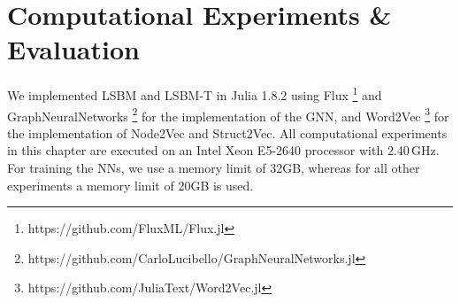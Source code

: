 \documentclass[draft,final]{vutinfth} %
\begin{document}



\chapter{Computational Experiments \& Evaluation}\label{chp:evaluation}

We implemented LSBM and LSBM-T in Julia 1.8.2 using Flux \footnote{https://github.com/FluxML/Flux.jl} and GraphNeuralNetworks \footnote{https://github.com/CarloLucibello/GraphNeuralNetworks.jl}\cite{Lucibello2021GNN} for the implementation of the GNN, and Word2Vec \footnote{https://github.com/JuliaText/Word2Vec.jl} for the implementation of Node2Vec and Struct2Vec. All computational experiments in this chapter are executed on an Intel Xeon E5-2640 processor with 2.40\,GHz. For training the NNs, we use a memory limit of 32GB, whereas for all other experiments a memory limit of 20GB is used. 
\end{document}
